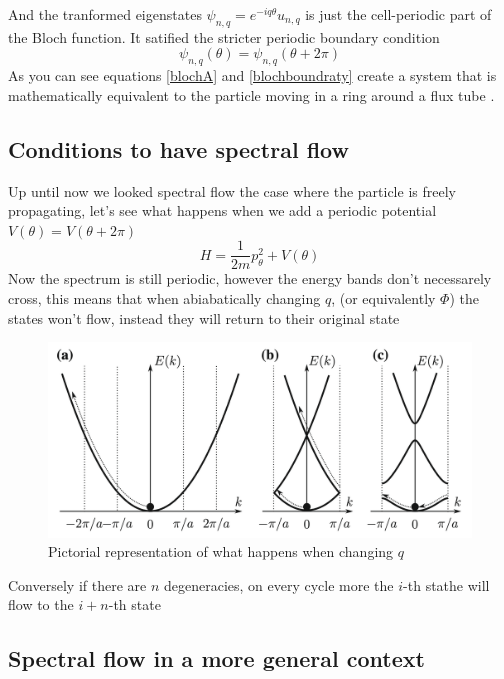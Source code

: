     
        And the tranformed eigenstates $\psi_{n,q}=e^{-iq\theta}u_{n,q}$ is just the cell-periodic part of the Bloch function. It satified the stricter periodic boundary condition
        \begin{equation} \label{blochboundraty}
            \psi_{n,q}(\theta)=\psi_{n,q}(\theta +2\pi)
        \end{equation}
        As you can see equations \ref{blochA}  and \ref{blochboundraty} create a system that is mathematically equivalent to the particle moving in a ring around a flux tube \cite{WeinbergBloch}.






    \subsection*{Conditions to have spectral flow}
        Up until now we looked spectral flow the case where the particle is freely propagating, let's see what happens when we add a periodic potential $V(\theta)=V(\theta+2\pi)$
        \[
            H=\frac 1{2m}p_\theta^2 + V(\theta)
        \]
        Now the spectrum is still periodic, however the energy bands don't necessarely cross, this means that  when abiabatically changing $q$, (or equivalently $\Phi$) the states won't flow, instead they will return to their original state
        \begin{figure}[h]
            \includegraphics[width=\linewidth]{Immagini/topo/grosso-flow.png}
            \caption{Pictorial representation of what happens when changing $q$}
        \end{figure}
        Conversely if there are $n$ degeneracies, on every cycle more the $i$-th stathe will flow to the $i+n$-th state


    
    \subsection*{Spectral flow in a more general context}
    
